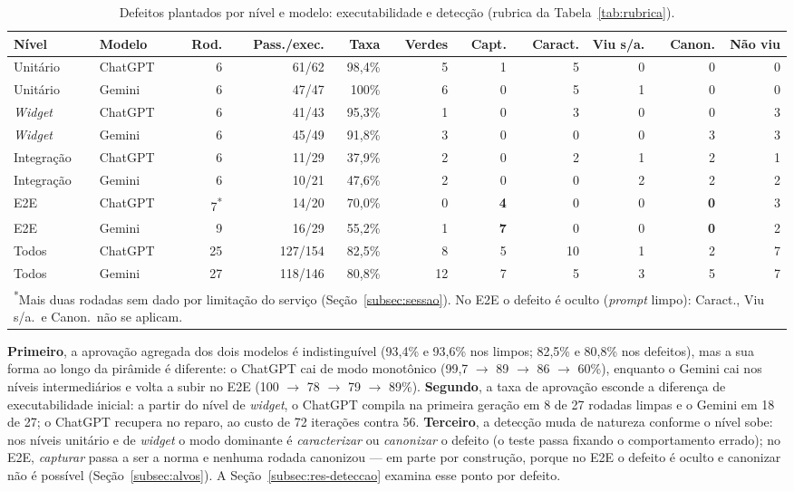 \documentclass[12pt]{article}
\begin{document}
\begin{table}[H]
\centering
\caption{Defeitos plantados por nível e modelo: executabilidade e detecção (rubrica da Tabela~\ref{tab:rubrica}).}
\label{tab:piramide-bugs}
\footnotesize
\setlength{\tabcolsep}{3pt}
\begin{tabular}{llrrrrrrrrr}
\toprule
\textbf{Nível} & \textbf{Modelo} & \textbf{Rod.} & \textbf{Pass./exec.} & \textbf{Taxa} & \textbf{Verdes} & \textbf{Capt.} & \textbf{Caract.} & \textbf{Viu s/a.} & \textbf{Canon.} & \textbf{Não viu} \\
\midrule
Unitário   & ChatGPT & 6 & 61/62 & 98,4\% & 5 & 1 & 5 & 0 & 0 & 0 \\
Unitário   & Gemini  & 6 & 47/47 & 100\%  & 6 & 0 & 5 & 1 & 0 & 0 \\
\textit{Widget} & ChatGPT & 6 & 41/43 & 95,3\% & 1 & 0 & 3 & 0 & 0 & 3 \\
\textit{Widget} & Gemini  & 6 & 45/49 & 91,8\% & 3 & 0 & 0 & 0 & 3 & 3 \\
Integração & ChatGPT & 6 & 11/29 & 37,9\% & 2 & 0 & 2 & 1 & 2 & 1 \\
Integração & Gemini  & 6 & 10/21 & 47,6\% & 2 & 0 & 0 & 2 & 2 & 2 \\
E2E        & ChatGPT & 7\textsuperscript{*} & 14/20 & 70,0\% & 0 & \textbf{4} & 0 & 0 & \textbf{0} & 3 \\
E2E        & Gemini  & 9 & 16/29 & 55,2\% & 1 & \textbf{7} & 0 & 0 & \textbf{0} & 2 \\
\midrule
Todos & ChatGPT & 25 & 127/154 & 82,5\% & 8 & 5 & 10 & 1 & 2 & 7 \\
Todos & Gemini  & 27 & 118/146 & 80,8\% & 12 & 7 & 5 & 3 & 5 & 7 \\
\bottomrule
\multicolumn{11}{p{14cm}}{\footnotesize \textsuperscript{*}Mais duas rodadas sem dado por limitação do serviço (Seção~\ref{subsec:sessao}). No E2E o defeito é oculto (\textit{prompt} limpo): Caract., Viu s/a.\ e Canon.\ não se aplicam.}
\end{tabular}
\end{table}

\textbf{Primeiro}, a aprovação agregada dos dois modelos é indistinguível
(93,4\% e 93,6\% nos limpos; 82,5\% e 80,8\% nos defeitos), mas a sua forma
ao longo da pirâmide é diferente: o ChatGPT cai de modo monotônico (99,7
$\to$ 89 $\to$ 86 $\to$ 60\%), enquanto o Gemini cai nos níveis intermediários
e volta a subir no E2E (100 $\to$ 78 $\to$ 79 $\to$ 89\%).
\textbf{Segundo}, a taxa de aprovação esconde a diferença de executabilidade
inicial: a partir do nível de \textit{widget}, o ChatGPT compila na primeira
geração em 8 de 27 rodadas limpas e o Gemini em 18 de 27; o ChatGPT recupera
no reparo, ao custo de 72 iterações contra 56. \textbf{Terceiro}, a detecção
muda de natureza conforme o nível sobe: nos níveis unitário e de
\textit{widget} o modo dominante é \emph{caracterizar} ou \emph{canonizar} o
defeito (o teste passa fixando o comportamento errado); no E2E,
\emph{capturar} passa a ser a norma e nenhuma rodada canonizou --- em parte
por construção, porque no E2E o defeito é oculto e canonizar não é possível
(Seção~\ref{subsec:alvos}). A
Seção~\ref{subsec:res-deteccao} examina esse ponto por defeito.
\end{document}
